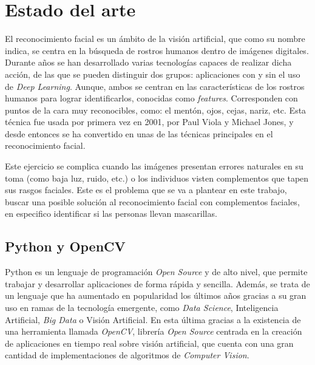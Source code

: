 
\chapter{Estado del arte}

\vspace{-1cm}
El reconocimiento facial es un ámbito de la visión artificial, que como su nombre indica, se centra en la búsqueda de rostros humanos dentro de imágenes digitales. Durante años se han desarrollado varias tecnologías capaces de realizar dicha acción, de las que se pueden distinguir dos grupos: aplicaciones con y sin el uso de \textit{Deep Learning}. Aunque, ambos se centran en las características de los rostros humanos para lograr identificarlos, conocidas como \textit{features}. Corresponden con puntos de la cara muy reconocibles, como: el mentón, ojos, cejas, nariz, etc. Esta técnica fue usada por primera vez en 2001, por Paul Viola y Michael Jones, y desde entonces se ha convertido en unas de las técnicas principales en el reconocimiento facial.

Este ejercicio se complica cuando las imágenes presentan errores naturales en su toma (como baja luz, ruido, etc.) o los individuos visten complementos que tapen sus rasgos faciales. Este es el problema que se va a plantear en este trabajo, buscar una posible solución al reconocimiento facial con complementos faciales, en especifico identificar si las personas llevan mascarillas.

\vspace{-0.7cm}
\section{Python y OpenCV}
\vspace{-0.5cm}

Python es un lenguaje de programación \textit{Open Source} y de alto nivel, que permite trabajar y desarrollar aplicaciones de forma rápida y sencilla. Además, se trata de un lenguaje que ha aumentado en popularidad los últimos años gracias a su gran uso en ramas de la tecnología emergente, como \textit{Data Science}, Inteligencia Artificial, \textit{Big Data} o Visión Artificial. En esta última gracias a la existencia de una herramienta llamada \textit{OpenCV}, librería \textit{Open Source} centrada en la creación de aplicaciones en tiempo real sobre visión artificial, que cuenta con una gran cantidad de implementaciones de algoritmos de \textit{Computer Vision}.

